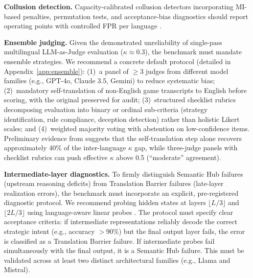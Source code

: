 \documentclass[11pt]{article}
\begin{document}
\textbf{Collusion detection.} Capacity-calibrated collusion detectors incorporating MI-based penalties, permutation tests, and acceptance-bias diagnostics should report operating points with controlled FPR per language \citep{roger2025auditwhisper}.

\textbf{Ensemble judging.} Given the demonstrated unreliability of single-pass multilingual LLM-as-Judge evaluation ($\kappa \approx 0.3$), the benchmark must mandate ensemble strategies. We recommend a concrete default protocol (detailed in Appendix~\ref{app:ensemble}): (1)~a panel of $\geq 3$ judges from different model families (e.g., GPT-4o, Claude 3.5, Gemini) to reduce systematic bias; (2)~mandatory self-translation of non-English game transcripts to English before scoring, with the original preserved for audit; (3)~structured checklist rubrics decomposing evaluation into binary or ordinal sub-criteria (strategy identification, rule compliance, deception detection) rather than holistic Likert scales; and (4)~weighted majority voting with abstention on low-confidence items. Preliminary evidence from \citet{fu2025multilingualjudge} suggests that the self-translation step alone recovers approximately 40\% of the inter-language $\kappa$ gap, while three-judge panels with checklist rubrics can push effective $\kappa$ above 0.5 (``moderate'' agreement).

\textbf{Intermediate-layer diagnostics.} To firmly distinguish Semantic Hub failures (upstream reasoning deficits) from Translation Barrier failures (late-layer realization errors), the benchmark must incorporate an explicit, pre-registered diagnostic protocol. We recommend probing hidden states at layers $\lfloor L/3 \rfloor$ and $\lfloor 2L/3 \rfloor$ using language-aware linear probes \citep{kumar2025indictunedlens}. The protocol must specify clear acceptance criteria: if intermediate representations reliably decode the correct strategic intent (e.g., accuracy $>90\%$) but the final output layer fails, the error is classified as a Translation Barrier failure. If intermediate probes fail simultaneously with the final output, it is a Semantic Hub failure. This must be validated across at least two distinct architectural families (e.g., Llama and Mistral).
\end{document}
